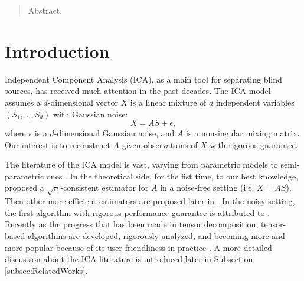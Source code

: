 \documentclass[twoside]{article}
\theoremstyle{definition}
\begin{document}
%

%


\begin{abstract}
Abstract.
\end{abstract}

\section{Introduction}
\label{sec:Intro}
Independent Component Analysis (ICA), as a main tool for separating blind sources, has received much attention in the past decades. 
The ICA model assumes a $d$-dimensional vector $X$ is a linear mixture of $d$ independent variables $(S_1,\ldots, S_d)$ with Gaussian noise:
\[
X = AS+\epsilon,
\]
where $\epsilon$ is a $d$-dimensional Gaussian noise, and $A$ is a nonsingular mixing matrix.
Our interest is to reconstruct $A$ given observations of $X$ with rigorous guarantee.

The literature of the ICA model is vast, varying from parametric models to semi-parametric ones
\citep{comon1994independent,pham1997blind,lee1999independent,HyvOja00,samarov2004nonparametric,eriksson2003characteristic,chen2005consistent,chen2006efficient}. 
In the theoretical side, \citet{samarov2004nonparametric} for the fist time, to our best knowledge, proposed a $\sqrt{n}$-consistent estimator for $A$ in a noise-free setting (i.e. $X= AS$). 
Then other more efficient estimators are proposed later in \citep{chen2005consistent,chen2006efficient}. 
In the noisy setting, the first algorithm with rigorous performance guarantee is attributed to \cite{arora2012provable}. 
Recently as the progress that has been made in tensor decomposition, tensor-based algorithms are developed, rigorously analyzed, and becoming more and more popular because of its user friendliness in practice \citep{hsu2013learning,anandkumar2012tensordecomposition,anandkumar2014provable,goyal2014fourier}.  
A more detailed discussion about the ICA literature is introduced later in Subsection \ref{subsec:RelatedWorks}.
\end{document}
